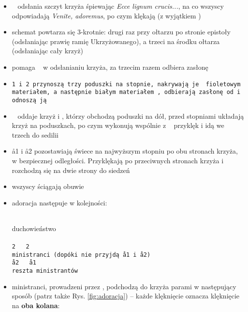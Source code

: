 \begin{itemize}
      \item \ii~ odsłania szczyt krzyża śpiewając \textit{Ecce lignum
                  crucis...}, na co wszyscy odpowiadają \textit{Venite,
                  adoremus}, po czym klękają (z wyjątkiem \ii)
      \item schemat powtarza się 3-krotnie: drugi raz przy ołtarzu po stronie
            epistoły (odsłaniając prawię ramię Ukrzyżowanego), a trzeci na
            środku ołtarza (odsłaniając cały krzyż)
      \item {} pomaga \ii~ w odsłanianiu krzyża, za trzecim razem odbiera
            zasłonę
      \item \tt1 i \tt2 przynoszą trzy poduszki na stopnie, nakrywają je
                  {\color{violet} fioletowym} materiałem, a następnie białym
            materiałem , odbierają zasłonę od  i odnoszą ją
      \item \ii~ oddaje krzyż  i , którzy obchodzą poduszki na dół,
            przed stopniami układają krzyż na poduszkach, po czym wykonują
            wspólnie z \ii~ przyklęk i idą we trzech do sedilii
      \item \aa1 i \aa2 pozostawiają świece na najwyższym stopniu po obu
            stronach krzyża, w bezpiecznej odległości. Przyklękają po
            przeciwnych stronach krzyża i rozchodzą się na dwie strony do
            siedzeń
      \item wszyscy ściągają obuwie
      \item adoracja następuje w kolejności:

            \begin{center}
                  \ii~ \smallskip\\
                  duchowieństwo \smallskip\\
                  ~~~ \smallskip\\
                  \tt2~~~\tt2 \smallskip\\
                  ministranci (dopóki nie przyjdą \aa1 i \aa2) \smallskip\\
                  \aa2~~~\aa1 \smallskip\\
                  reszta ministrantów
            \end{center}

      \item ministranci, prowadzeni przez , podchodzą do krzyża parami w
            następujący sposób (patrz także Rys. \ref{fig:adoracja}) -- każde
            klęknięcie oznacza klęknięcie na \textbf{oba kolana}:


\end{itemize}
